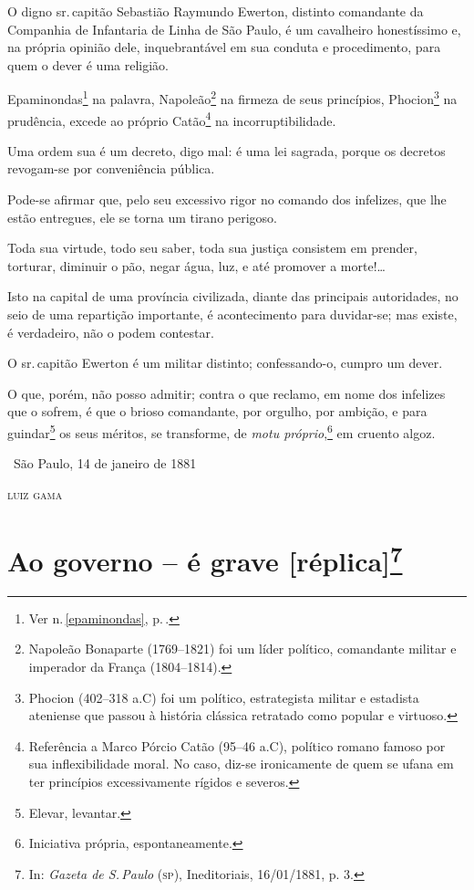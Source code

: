 {
O digno sr.\,capitão Sebastião Raymundo Ewerton, distinto comandante da
Companhia de Infantaria de Linha de São Paulo, é um cavalheiro
honestíssimo e, na própria opinião dele, inquebrantável em sua conduta e
procedimento, para quem o dever é uma religião.

Epaminondas\footnote{Ver n.\,\ref{epaminondas}, p.\,\pageref{epaminondas}.} na palavra, Napoleão\footnote{Napoleão Bonaparte 
  (1769--1821) foi um líder político, comandante militar e imperador da
  França (1804--1814).} na firmeza de seus princípios, Phocion\footnote{
  Phocion (402--318 a.C) foi um político, estrategista militar e
  estadista ateniense que passou à história clássica retratado como
  popular e virtuoso.} na prudência, excede ao próprio Catão\footnote{
  Referência a Marco Pórcio Catão (95--46 a.C), político romano famoso
  por sua inflexibilidade moral. No caso, diz-se ironicamente de quem se
  ufana em ter princípios excessivamente rígidos e severos.} na
incorruptibilidade.

Uma ordem sua é um decreto, digo mal: é uma lei sagrada, porque os
decretos revogam-se por conveniência pública.

Pode-se afirmar que, pelo seu excessivo rigor no comando dos infelizes,
que lhe estão entregues, ele se torna um tirano perigoso.

Toda sua virtude, todo seu saber, toda sua justiça consistem em prender,
torturar, diminuir o pão, negar água, luz, e até promover a
morte!\ldots{}

Isto na capital de uma província civilizada, diante das principais
autoridades, no seio de uma repartição importante, é acontecimento para
duvidar-se; mas existe, é verdadeiro, não o podem contestar.

O sr.\,capitão Ewerton é um militar distinto; confessando-o, cumpro um
dever.

O que, porém, não posso admitir; contra o que reclamo, em nome dos
infelizes que o sofrem, é que o brioso comandante, por orgulho, por
ambição, e para guindar\footnote{Elevar, levantar.} os seus méritos,
se transforme, de \emph{motu próprio},\footnote{Iniciativa
  própria, espontaneamente.} em cruento algoz.

\medskip
\hfill\ São Paulo, 14 de janeiro de 1881

\hfill\textsc{luiz gama}

\pagebreak
\section{Ao governo -- é grave {[}réplica{]}\protect\footnote{\MakeUppercase{I}n:
  \emph{\MakeUppercase{G}azeta de \MakeUppercase{S.\,P}aulo} (\textsc{sp}), \MakeUppercase{I}neditoriais, 16/01/1881, p. 3.}}

}
